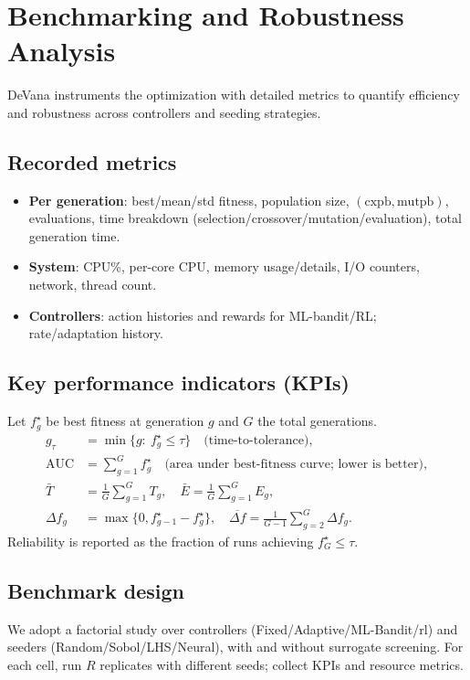 \documentclass[12pt,a4paper]{article}
\begin{document}
\section{Benchmarking and Robustness Analysis}
\label{sec:benchmarking}
DeVana instruments the optimization with detailed metrics to quantify efficiency and robustness across controllers and seeding strategies.

\subsection{Recorded metrics}
\begin{itemize}
    \item \textbf{Per generation}: best/mean/std fitness, population size, $(\text{cxpb},\text{mutpb})$, evaluations, time breakdown (selection/crossover/mutation/evaluation), total generation time.
    \item \textbf{System}: CPU\%, per-core CPU, memory usage/details, I/O counters, network, thread count.
    \item \textbf{Controllers}: action histories and rewards for ML-bandit/RL; rate/adaptation history.
\end{itemize}

\subsection{Key performance indicators (KPIs)}
Let $f^{\star}_g$ be best fitness at generation $g$ and $G$ the total generations.
\begin{align}
    g_{\tau} &= \min\{g:\ f^{\star}_g\le\tau\}\quad\text{(time-to-tolerance)},\\
    \mathrm{AUC} &= \sum_{g=1}^{G} f^{\star}_g\quad\text{(area under best-fitness curve; lower is better)},\\
    \bar T &= \frac{1}{G}\sum_{g=1}^{G} T_g,\quad \bar E = \frac{1}{G}\sum_{g=1}^{G} E_g,\\
    \Delta f_g &= \max\{0, f^{\star}_{g-1}-f^{\star}_g\},\quad \overline{\Delta f}=\frac{1}{G-1}\sum_{g=2}^{G}\Delta f_g.
\end{align}
Reliability is reported as the fraction of runs achieving $f^{\star}_G\le\tau$.

\subsection{Benchmark design}
We adopt a factorial study over controllers (Fixed/Adaptive/ML-Bandit/\gls{rl}) and seeders (Random/Sobol/LHS/Neural), with and without surrogate screening. For each cell, run $R$ replicates with different seeds; collect KPIs and resource metrics.
\end{document}
